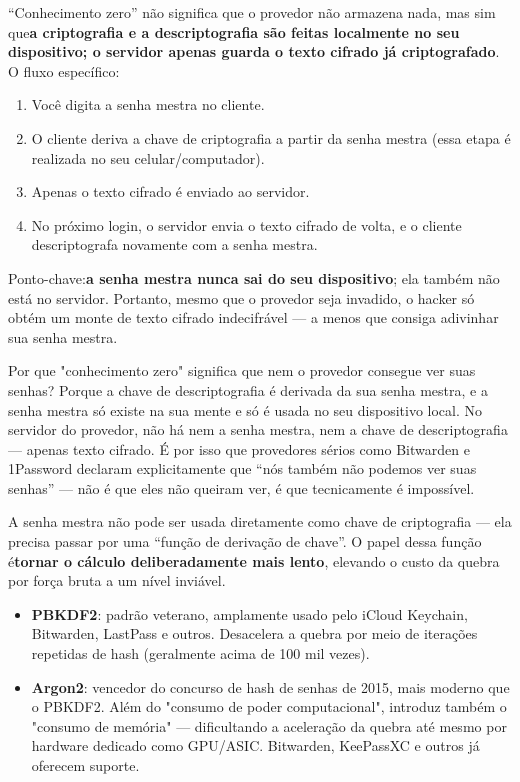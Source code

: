 
“Conhecimento zero” não significa que o provedor não armazena nada, mas sim que\textbf{a criptografia e a descriptografia são feitas localmente no seu dispositivo; o servidor apenas guarda o texto cifrado já criptografado}. O fluxo específico:

\begin{enumerate}
  \item Você digita a senha mestra no cliente.
  \item O cliente deriva a chave de criptografia a partir da senha mestra (essa etapa é realizada no seu celular/computador).
  \item Apenas o texto cifrado é enviado ao servidor.
  \item No próximo login, o servidor envia o texto cifrado de volta, e o cliente descriptografa novamente com a senha mestra.
\end{enumerate}

Ponto-chave:\textbf{a senha mestra nunca sai do seu dispositivo}; ela também não está no servidor. Portanto, mesmo que o provedor seja invadido, o hacker só obtém um monte de texto cifrado indecifrável — a menos que consiga adivinhar sua senha mestra.

\begin{tcbinfo}{Por que "conhecimento zero" significa que nem o provedor consegue ver suas senhas?}
Porque a chave de descriptografia é derivada da sua senha mestra, e a senha mestra só existe na sua mente e só é usada no seu dispositivo local. No servidor do provedor, não há nem a senha mestra, nem a chave de descriptografia — apenas texto cifrado. É por isso que provedores sérios como Bitwarden e 1Password declaram explicitamente que “nós também não podemos ver suas senhas” — não é que eles não queiram ver, é que tecnicamente é impossível.

\end{tcbinfo}


A senha mestra não pode ser usada diretamente como chave de criptografia — ela precisa passar por uma “função de derivação de chave”. O papel dessa função é\textbf{tornar o cálculo deliberadamente mais lento}, elevando o custo da quebra por força bruta a um nível inviável.

\begin{itemize}
  \item \textbf{PBKDF2}: padrão veterano, amplamente usado pelo iCloud Keychain, Bitwarden, LastPass e outros. Desacelera a quebra por meio de iterações repetidas de hash (geralmente acima de 100 mil vezes).
  \item \textbf{Argon2}: vencedor do concurso de hash de senhas de 2015, mais moderno que o PBKDF2. Além do "consumo de poder computacional", introduz também o "consumo de memória" — dificultando a aceleração da quebra até mesmo por hardware dedicado como GPU/ASIC. Bitwarden, KeePassXC e outros já oferecem suporte.
\end{itemize}

